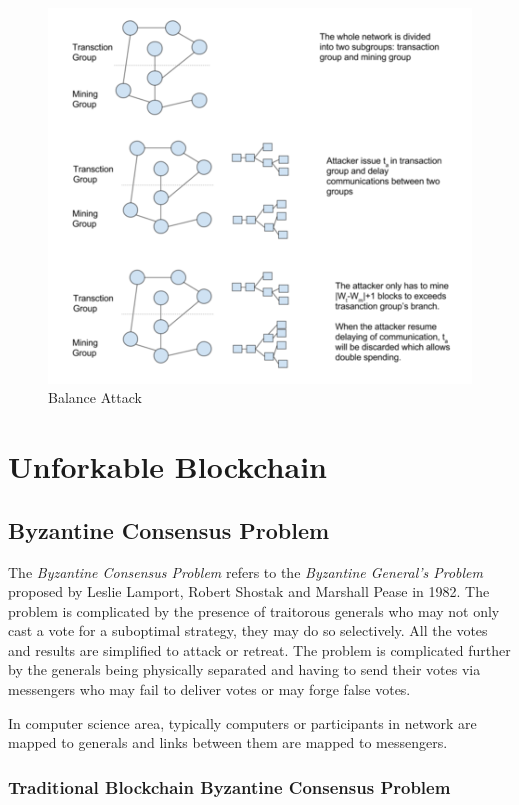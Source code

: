 \documentclass[12pt]{article}
\begin{document}
\begin{figure}
    \includegraphics{balance_attack.png}
    \caption{Balance Attack}
    \label{fig:balance_attack}
\end{figure}

\section{Unforkable Blockchain}
\label{sec:Unforkable Blockchain}

\subsection{Byzantine Consensus Problem}

The \textit{Byzantine Consensus Problem} refers to the \textit{Byzantine General's Problem} proposed by Leslie Lamport, Robert Shostak and Marshall Pease in 1982. The problem is complicated by the presence of traitorous generals who may not only cast a vote for a suboptimal strategy, they may do so selectively. All the votes and results are simplified to attack or retreat. The problem is complicated further by the generals being physically separated and having to send their votes via messengers who may fail to deliver votes or may forge false votes.

In computer science area, typically computers or participants in network are mapped to generals and links between them are mapped to messengers.

\subsubsection{Traditional Blockchain Byzantine Consensus Problem}
\end{document}

